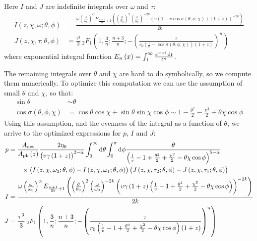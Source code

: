 \documentclass[manuscript]{aastex}
\begin{document}
Here $I$ and $J$ are indefinite integrals over $\omega$ and $\tau$:
\begin{align}
I\left(z,\chi,\omega;\theta,\phi\right) &= \frac{
	\omega
	\left(\frac{\omega}{\omega_0}\right)^{\alpha }
	E_{\frac{\alpha +1}{2 k}+1}\left(
		\left(\frac{\theta}{\theta_0}\right)^2
		\left(\frac{\omega}{\omega_0}\right)^{-2k}
		\left(
			\gamma \left(1-v \cos \sigma\left(\theta ,\phi ,\chi \right) \right) \left(1+z\right)
		\right)^{-2 k}
	\right)
}{
	2 k
} \\
J\left(z,\chi,\tau;\theta,\phi\right) &= \frac{\tau^3}{3} \,
_2F_1\left(
	1,
	\frac{3}{n};
	\frac{n+3}{n};
	-\left(\frac{\tau}{
		r_0 \left( \frac{1}{v} - \cos\sigma\left( \theta,\phi,\chi \right) \right) \left(1+z\right)
	}\right)^n
\right)
\end{align}
where exponential integral function $E_n\left(x\right) = \int_1^\infty \frac{e^{-x t} \dif t}{t^n}$.

The remaining integrals over $\theta$ and $\chi$ are hard to do symbolically, so we compute them numerically. To optimize this computation we can use the assumption of small $\theta$ and $\chi$, so that:
\begin{align*}
\sin\theta &\sim \theta \\
\cos\sigma\left(\theta, \phi, \chi \right) &= \cos\theta \cos\chi + \sin\theta \sin\chi \cos\phi \sim 1 - \frac{\theta^2}{2} - \frac{\chi^2}{2} + \theta\chi\cos\phi
\end{align*}
Using this assumption, and the evenness of the integral as a function of $\theta$, we arrive to the optimized expressions for $p$, $I$ and $J$:
\begin{align}
\label{eq:p}
p &= \frac{A_\text{det}}{A_\text{ph}\left(z\right)}
\frac{2\eta_0}{\left(v\gamma\left(1+z\right)\right)^{2-\alpha}}
\int_0^{\infty} \dif \theta \int_0^{\pi} \dif \phi \frac{\theta}{\left(\frac{1}{v} - 1 + \frac{\theta^2}{2} + \frac{\chi^2}{2} - \theta\chi\cos\phi\right)^{5-\alpha}}\nonumber\\
&\qquad {} \times \left( I\left(z,\chi,\omega_2; \theta,\phi\right) - I\left(z,\chi,\omega_1; \theta,\phi\right) \right) \left( J\left(z,\chi,\tau_2; \theta,\phi\right) - J\left( z,\chi,\tau_1; \theta,\phi \right) \right) \\
I &= \frac{
	\omega
	\left(\frac{\omega}{\omega_0}\right)^{\alpha }
	E_{\frac{\alpha +1}{2 k}+1}\left(
		\left(\frac{\theta}{\theta_0}\right)^2
		\left(\frac{\omega}{\omega_0}\right)^{-2 k}
		\left(
			v \gamma \left(1+z\right) \left(\frac{1}{v} - 1 + \frac{\theta^2}{2} + \frac{\chi^2}{2} - \theta\chi\cos\phi \right)
		\right)^{-2 k}
	\right)
}{
	2 k
} \\
J &= \frac{\tau^3}{3} \,
_2F_1\left(
	1,
	\frac{3}{n};
	\frac{n+3}{n};
	-\left(\frac{\tau}{
		r_0 \left( \frac{1}{v} -  1 + \frac{\theta^2}{2} + \frac{\chi^2}{2} - \theta\chi\cos\phi \right) \left(1+z\right)
	}\right)^n
\right)
\end{align}
\end{document}
